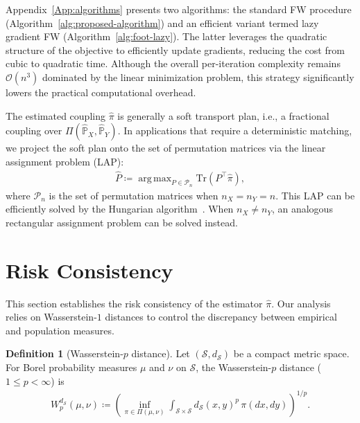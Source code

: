 \documentclass{article}
\theoremstyle{plain}
\theoremstyle{definition}
\newtheorem{definition}[theorem]{Definition}
\theoremstyle{remark}
\DeclareMathOperator*{\argmax}{arg\,max}
\begin{document}
Appendix~\ref{App:algorithms} presents two algorithms: the standard FW procedure (Algorithm~\ref{alg:proposed-algorithm}) and an efficient variant termed lazy gradient FW (Algorithm~\ref{alg:foot-lazy}). The latter leverages the quadratic structure of the objective to efficiently update gradients, reducing the cost from cubic to quadratic time. Although the overall per-iteration complexity remains $\mathcal{O}(n^3)$ dominated by the linear minimization problem, this strategy significantly lowers the practical computational overhead.

The estimated coupling $\hat{\pi}$ is generally a soft transport plan, i.e., a fractional coupling over $\Pi(\hat{\mathbb{P}}_X,\hat{\mathbb{P}}_Y)$. 
In applications that require a deterministic matching, we project the soft plan onto the set of permutation matrices via the linear assignment problem (LAP):
\begin{align}
	\label{eq:finite-projection-method}
	\hat{P} \coloneqq \argmax_{P \in \mathcal{P}_n} \mathrm{Tr}(P^\top\hat{\pi}) ,
\end{align}
where $\mathcal{P}_n$ is the set of permutation matrices when $n_X \!=\! n_Y \!=\! n$. This LAP can be efficiently solved by the Hungarian algorithm~\citep{kuhn1955hungarian}. When $n_X \neq n_Y$, an analogous rectangular assignment problem can be solved instead.

\section{Risk Consistency}\label{sec:Consistency}
This section establishes the risk consistency of the estimator $\hat{\pi}$. Our analysis relies on Wasserstein-$1$ distances to control the discrepancy between empirical and population measures.

\begin{definition}[Wasserstein-$p$ distance]
	\label{def:Wasserstein-p}
	Let $(\mathcal{S},d_{\mathcal{S}})$ be a compact metric space. For Borel probability measures $\mu$ and $\nu$ on $\mathcal{S}$, the Wasserstein-$p$ distance ($1 \leq p < \infty$) is
	\begin{align*}
		W_p^{d_{\mathcal{S}}}(\mu,\nu) \coloneqq \left(\inf_{\pi \in \Pi(\mu,\nu)} \int_{\mathcal{S} \times \mathcal{S}} d_{\mathcal{S}}(x,y)^p \, \pi(dx,dy)\right)^{1/p}.
	\end{align*}
\end{definition}
\end{document}
